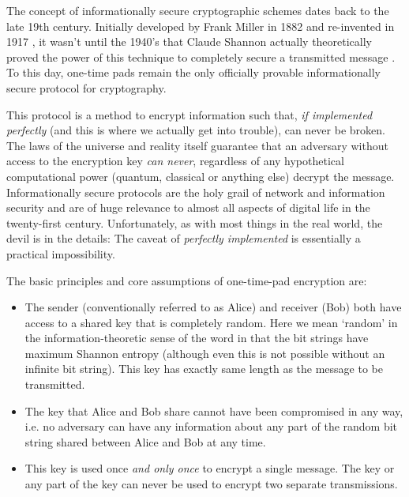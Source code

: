 \documentclass[twocolumn, aps, rmp, amsmath, amssymb, nofootinbib, superscriptaddress, longbibliography, floatfix, table-of-contents, eqsecnum]{revtex4-2}
\begin{document}
The concept of informationally secure cryptographic schemes dates back to the late 19th century. Initially developed by Frank Miller in 1882 \cite{?} and re-invented in 1917 \cite{?}, it wasn't until the 1940's that Claude Shannon actually theoretically proved the power of this technique to completely secure a transmitted message \cite{?}. To this day, one-time pads remain the only officially provable informationally secure protocol for cryptography. 

This protocol is a method to encrypt information such that, \textit{if implemented perfectly} (and this is where we actually get into trouble), can never be broken. The laws of the universe and reality itself guarantee that an adversary without access to the encryption key \textit{can never}, regardless of any hypothetical computational power (quantum, classical or anything else) decrypt the message. Informationally secure protocols are the holy grail of network and information security and are of huge relevance to almost all aspects of digital life in the twenty-first century. Unfortunately, as with most things in the real world, the devil is in the details: The caveat of \textit{perfectly implemented} is essentially a practical impossibility. 

The basic principles and core assumptions of one-time-pad encryption are:
\begin{itemize}
\item The sender (conventionally referred to as Alice) and receiver (Bob) both have access to a shared key that is completely random. Here we mean `random' in the information-theoretic sense of the word in that the bit strings have maximum Shannon entropy (although even this is not possible without an infinite bit string). This key has exactly same length as the message to be transmitted.
\item The key that Alice and Bob share cannot have been compromised in any way, i.e. no adversary can have any information about any part of the random bit string shared between Alice and Bob at any time.
\item This key is used once \textit{and only once} to encrypt a single message. The key or any part of the key can never be used to encrypt two separate transmissions.
\end{itemize}
\end{document}

